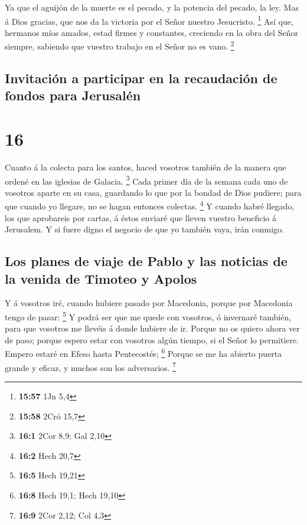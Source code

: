  Ya que el aguijón de la muerte es el pecado, y la
potencia del pecado, la ley.  Mas á Dios gracias, que nos
da la victoria por el Señor nuestro Jesucristo. \footnote{\textbf{15:57}
  1Jn 5,4}  Así que, hermanos míos amados, estad firmes y
constantes, creciendo en la obra del Señor siempre, sabiendo que vuestro
trabajo en el Señor no es vano. \footnote{\textbf{15:58} 2Cró 15,7}

\hypertarget{invitaciuxf3n-a-participar-en-la-recaudaciuxf3n-de-fondos-para-jerusaluxe9n}{%
\subsection{Invitación a participar en la recaudación de fondos para
Jerusalén}\label{invitaciuxf3n-a-participar-en-la-recaudaciuxf3n-de-fondos-para-jerusaluxe9n}}

\hypertarget{section-15}{%
\section{16}\label{section-15}}

 Cuanto á la colecta para los santos, haced vosotros
también de la manera que ordené en las iglesias de Galacia. \footnote{\textbf{16:1}
  2Cor 8,9; Gal 2,10}  Cada primer día de la semana cada
uno de vosotros aparte en su casa, guardando lo que por la bondad de
Dios pudiere; para que cuando yo llegare, no se hagan entonces colectas.
\footnote{\textbf{16:2} Hech 20,7}  Y cuando habré
llegado, los que aprobareis por cartas, á éstos enviaré que lleven
vuestro beneficio á Jerusalem.  Y si fuere digno el
negocio de que yo también vaya, irán conmigo.

\hypertarget{los-planes-de-viaje-de-pablo-y-las-noticias-de-la-venida-de-timoteo-y-apolos}{%
\subsection{Los planes de viaje de Pablo y las noticias de la venida de
Timoteo y
Apolos}\label{los-planes-de-viaje-de-pablo-y-las-noticias-de-la-venida-de-timoteo-y-apolos}}

 Y á vosotros iré, cuando hubiere pasado por Macedonia,
porque por Macedonia tengo de pasar: \footnote{\textbf{16:5} Hech 19,21}
 Y podrá ser que me quede con vosotros, ó invernaré
también, para que vosotros me llevéis á donde hubiere de ir.
 Porque no os quiero ahora ver de paso; porque espero
estar con vosotros algún tiempo, si el Señor lo permitiere.
 Empero estaré en Efeso hasta Pentecostés; \footnote{\textbf{16:8}
  Hech 19,1; Hech 19,10}  Porque se me ha abierto puerta
grande y eficaz, y muchos son los adversarios. \footnote{\textbf{16:9}
  2Cor 2,12; Col 4,3}


